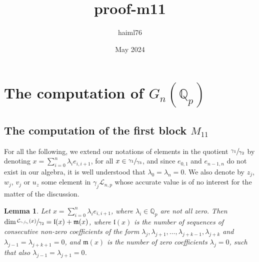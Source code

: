 \documentclass[12pt,fleqn]{article}
\title{proof-m11}
\author{haiml76 }
\date{May 2024}
\newtheorem{lemma}[theorem]{Lemma}
\begin{document}
\section{The computation of $G_n(\mathbb{Q}_p)$}
\subsection{The computation of the first block $M_{11}$}
For all the following, we extend our notations of elements in the quotient $\sfrac{\gamma_1}{\gamma_2}$ by denoting $x=\sum_{i=0}^n\lambda_i e_{i,i+1}$, for all $x\in\sfrac{\gamma_1}{\gamma_3}$, and since $e_{0,1}$ and $e_{n-1,n}$ do not exist in our algebra, it is well understood that $\lambda_0=\lambda_n=0$. We also denote by $z_j$, $w_j$, $v_j$ or $u_z$ some element in $\gamma_j\mathcal{L}_{n,p}$ whose accurate value is of no interest for the matter of the discussion.
\begin{lemma}
\label{prop.centralizer.dimension}
Let $x=\sum_{i=0}^n\lambda_i e_{i,i+1}$, where $\lambda_i\in\mathbb{Q}_p$ are not all zero. Then $\dim\sfrac{\mathcal{C}_{\sfrac{\gamma_1}{\gamma_3}}(x)}{\gamma_2}=\mathfrak{l}(x)+\mathfrak{m}(x)$, where $\mathfrak{l}(x)$ is the number of sequences of consecutive non-zero coefficients of the form $\lambda_j,\lambda_{j+1},\dots,\lambda_{j+k-1},\lambda_{j+k}$ and $\lambda_{j-1}=\lambda_{j+k+1}=0$, and $\mathfrak{m}(x)$ is the number of zero coefficients $\lambda_j=0$, such that also $\lambda_{j-1}=\lambda_{j+1}=0$.
\end{lemma}
\end{document}
